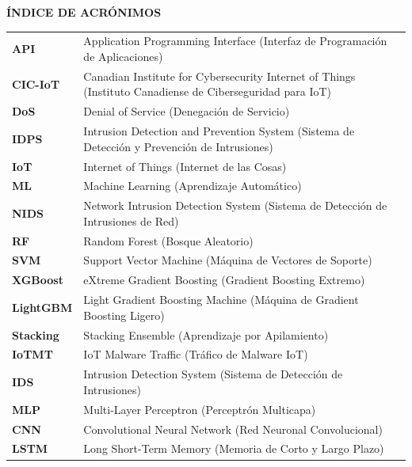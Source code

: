 
\newpage
\begin{center}
    \MakeUppercase{\textbf{Índice de Acrónimos}}
\end{center}

\vspace{1.5cm}

\begin{flushleft}
\begin{tabular}{p{3.5cm} p{11.5cm}}
    \textbf{API} & Application Programming Interface (Interfaz de Programación de Aplicaciones) \\
    \textbf{CIC-IoT} & Canadian Institute for Cybersecurity Internet of Things (Instituto Canadiense de Ciberseguridad para IoT) \\
    \textbf{DoS} & Denial of Service (Denegación de Servicio) \\
    \textbf{IDPS} & Intrusion Detection and Prevention System (Sistema de Detección y Prevención de Intrusiones) \\
    \textbf{IoT} & Internet of Things (Internet de las Cosas) \\
    \textbf{ML} & Machine Learning (Aprendizaje Automático) \\
    \textbf{NIDS} & Network Intrusion Detection System (Sistema de Detección de Intrusiones de Red) \\
    \textbf{RF} & Random Forest (Bosque Aleatorio) \\
    \textbf{SVM} & Support Vector Machine (Máquina de Vectores de Soporte) \\
    \textbf{XGBoost} & eXtreme Gradient Boosting (Gradient Boosting Extremo) \\
    \textbf{LightGBM} & Light Gradient Boosting Machine (Máquina de Gradient Boosting Ligero) \\
    \textbf{Stacking} & Stacking Ensemble (Aprendizaje por Apilamiento) \\
    \textbf{IoTMT} & IoT Malware Traffic (Tráfico de Malware IoT) \\
    \textbf{IDS} & Intrusion Detection System (Sistema de Detección de Intrusiones) \\
    \textbf{MLP} & Multi-Layer Perceptron (Perceptrón Multicapa) \\
    \textbf{CNN} & Convolutional Neural Network (Red Neuronal Convolucional) \\
    \textbf{LSTM} & Long Short-Term Memory (Memoria de Corto y Largo Plazo) \\
\end{tabular}
\end{flushleft}


